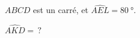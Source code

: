 
\begin{mental}
    \( ABCD\) est un carré, et \( \widehat{AEL}=\SI{80}{\degree}\).

    \begin{center}

    \end{center}

    \( \widehat{AKD}=\,?\)
\end{mental}
